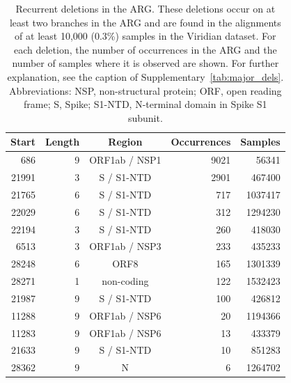 \documentclass[12pt]{article}
\newcommand{\siref}[1]{Supplementary~\ref{#1}}
\begin{document}
\begin{table}
\centering
\caption{
Recurrent deletions in the ARG.
These deletions occur on at least two branches in the ARG and
are found in the alignments of at least 10,000 (0.3\%) samples
in the Viridian dataset.
For each deletion, the number of occurrences in the ARG and
the number of samples where it is observed are shown.
For further explanation,
see the caption of \siref{tab:major_dels}.
Abbreviations:
NSP, non-structural protein;
ORF, open reading frame;
S, Spike;
S1-NTD, N-terminal domain in Spike S1 subunit.
}
\label{tab:rec_dels}
\begin{tabular}{rrcrr}
\toprule
Start & Length & Region & Occurrences & Samples\\
\midrule
686 & 9 & ORF1ab / NSP1 & 9021 & 56341\\
21991 & 3 & S / S1-NTD & 2901 & 467400\\
21765 & 6 & S / S1-NTD & 717 & 1037417\\
22029 & 6 & S / S1-NTD & 312 & 1294230\\
22194 & 3 & S / S1-NTD & 260 & 418030\\
6513 & 3 & ORF1ab / NSP3 & 233 & 435233\\
28248 & 6 & ORF8 & 165 & 1301339\\
28271 & 1 & non-coding & 122 & 1532423\\
21987 & 9 & S / S1-NTD & 100 & 426812\\
11288 & 9 & ORF1ab / NSP6 & 20 & 1194366\\
11283 & 9 & ORF1ab / NSP6 & 13 & 433379\\
21633 & 9 & S / S1-NTD & 10 & 851283\\
28362 & 9 & N & 6 & 1264702\\
\bottomrule
\end{tabular}
\end{table}

\clearpage %


\nolinenumbers %
\linenumbers
\restoregeometry %
\end{document}
